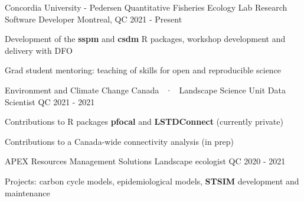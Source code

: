 \vspace{5pt}

\vspace{-2pt}
\begin{cventries}

  \cventry
    {Concordia University - Pedersen Quantitative Fisheries Ecology Lab} %
    {Research Software Developer} %
    {Montreal, QC} %
    {2021 - Present} %
    {
      \begin{cvitems} %
        \item {Development of the \textbf{sspm} and \textbf{csdm} R packages, workshop development and delivery with DFO}
        \item {Grad student mentoring: teaching of skills for open and reproducible science}
      \end{cvitems}
    }

  \cventry
  {Environment and Climate Change Canada ~·~ Landscape Science Unit} %
  {Data Scientist} %
  {QC} %
  {2021 - 2021} %
  {
    \begin{cvitems} %
      \item {Contributions to R packages \textbf{pfocal} and \textbf{LSTDConnect} (currently private)}
      \item {Contributions to a Canada-wide connectivity analysis (in prep)}
    \end{cvitems}
  }

  \cventry
  {APEX Resources Management Solutions} %
  {Landscape ecologist} %
  {QC} %
  {2020 - 2021} %
  {
    \begin{cvitems} %
      \item {Projects: carbon cycle models, epidemiological models, \textbf{STSIM} development and maintenance}
    \end{cvitems}
  }

\end{cventries}

